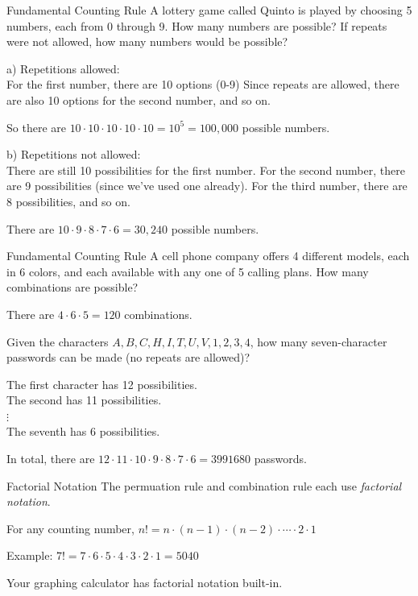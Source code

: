 \documentclass[t, aspectratio=169]{beamer}
\newcommand{\?}{\stackrel{?}{=}}
\begin{document}
	\begin{frame}{Fundamental Counting Rule}
		A lottery game called Quinto is played by choosing 5 numbers, each from 0 through 9. How many numbers are possible? If repeats were not allowed, how many numbers would be possible? \pause
		
		a) Repetitions allowed: \\
		For the first number, there are 10 options (0-9) \pause
		Since repeats are allowed, there are also 10 options for the second number, and so on. \pause
		
		So there are $10 \cdot 10 \cdot 10 \cdot 10 \cdot 10 = 10^5 = 100,000$ possible numbers. \pause
		
		b) Repetitions not allowed: \\
		There are still 10 possibilities for the first number. \pause
		For the second number, there are 9 possibilities (since we've used one already).
		For the third number, there are 8 possibilities, and so on. \pause
		
		There are $10 \cdot 9 \cdot 8 \cdot 7 \cdot 6 = 30,240$ possible numbers.
	\end{frame}

	\begin{frame}{Fundamental Counting Rule}
		A cell phone company offers 4 different models, each in 6 colors, and each available with any one of 5 calling plans. How many combinations are possible? \pause
		
		There are $4 \cdot 6 \cdot 5 = 120$ combinations. \pause
		
		Given the characters $A, B, C, H, I, T, U, V, 1, 2, 3, 4$, how many seven-character passwords can be made (no repeats are allowed)? \pause
		
		The first character has 12 possibilities. \\ \pause
		The second has 11 possibilities. \\ \pause
		$\vdots$ \\
		The seventh has 6 possibilities. \pause
		
		In total, there are $12 \cdot 11 \cdot 10 \cdot 9 \cdot 8 \cdot 7 \cdot 6 = 3991680$ passwords.
	\end{frame}

	\begin{frame}{Factorial Notation}
		The permuation rule and combination rule each use \textit{factorial notation}. \pause
		
		For any counting number, $n! = n \cdot (n - 1) \cdot (n - 2) \cdot \cdots \cdot 2 \cdot 1$
		
		Example: $7! = 7 \cdot 6 \cdot 5 \cdot 4 \cdot 3 \cdot 2 \cdot 1 = 5040$ \pause
		
		Your graphing calculator has factorial notation built-in.
	\end{frame}
\end{document}
